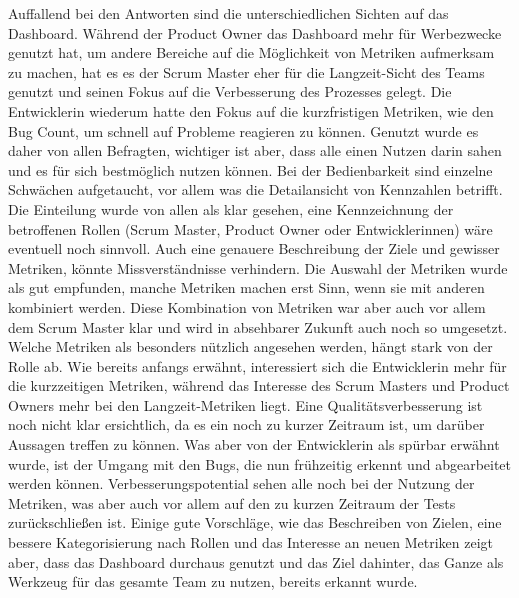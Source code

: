 Auffallend bei den Antworten sind die unterschiedlichen Sichten auf das Dashboard.
Während der Product Owner das Dashboard mehr für Werbezwecke genutzt hat, um andere Bereiche auf die Möglichkeit von Metriken aufmerksam zu machen, hat es es der Scrum Master eher für die Langzeit-Sicht des Teams genutzt und seinen Fokus auf die Verbesserung des Prozesses gelegt.
Die Entwicklerin wiederum hatte den Fokus auf die kurzfristigen Metriken, wie den Bug Count, um schnell auf Probleme reagieren zu können.
Genutzt wurde es daher von allen Befragten, wichtiger ist aber, dass alle einen Nutzen darin sahen und es für sich bestmöglich nutzen können.
Bei der Bedienbarkeit sind einzelne Schwächen aufgetaucht, vor allem was die Detailansicht von Kennzahlen betrifft.
Die Einteilung wurde von allen als klar gesehen, eine Kennzeichnung der betroffenen Rollen (Scrum Master, Product Owner oder Entwicklerinnen) wäre eventuell noch sinnvoll.
Auch eine genauere Beschreibung der Ziele und gewisser Metriken, könnte Missverständnisse verhindern.
Die Auswahl der Metriken wurde als gut empfunden, manche Metriken machen erst Sinn, wenn sie mit anderen kombiniert werden.
Diese Kombination von Metriken war aber auch vor allem dem Scrum Master klar und wird in absehbarer Zukunft auch noch so umgesetzt.
Welche Metriken als besonders nützlich angesehen werden, hängt stark von der Rolle ab.
Wie bereits anfangs erwähnt, interessiert sich die Entwicklerin mehr für die kurzzeitigen Metriken, während das Interesse des Scrum Masters und Product Owners mehr bei den Langzeit-Metriken liegt.
Eine Qualitätsverbesserung ist noch nicht klar ersichtlich, da es ein noch zu kurzer Zeitraum ist, um darüber Aussagen treffen zu können.
Was aber von der Entwicklerin als spürbar erwähnt wurde, ist der Umgang mit den Bugs, die nun frühzeitig erkennt und abgearbeitet werden können.
Verbesserungspotential sehen alle noch bei der Nutzung der Metriken, was aber auch vor allem auf den zu kurzen Zeitraum der Tests zurückschließen ist.
Einige gute Vorschläge, wie das Beschreiben von Zielen, eine bessere Kategorisierung nach Rollen und das Interesse an neuen Metriken zeigt aber, dass das Dashboard durchaus genutzt und das Ziel dahinter, das Ganze als Werkzeug für das gesamte Team zu nutzen, bereits erkannt wurde.
